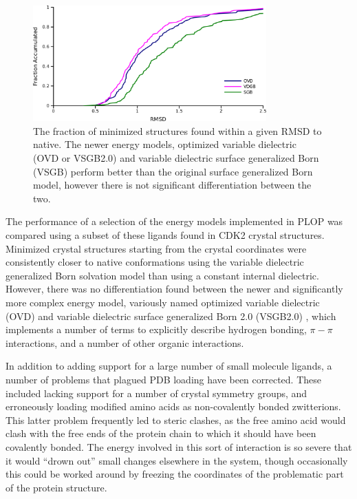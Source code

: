 \begin{figure}[h]
\centering
\includegraphics[width=0.8\textwidth]{figures/small_molecule_minimization.png}
\caption{The fraction of minimized structures found within a given RMSD to native.
The newer energy models, optimized variable dielectric (OVD or VSGB2.0) and variable dielectric surface generalized Born (VSGB) perform better than the original surface generalized Born model, however there is not significant differentiation between the two.}
\label{figure:small_molecule_minimization}
\end{figure}

The performance of a selection of the energy models implemented in PLOP was compared using a subset of these ligands found in CDK2 crystal structures.
Minimized crystal structures starting from the crystal coordinates were consistently closer to native conformations using the variable dielectric generalized Born solvation model than using a constant internal dielectric.
However, there was no differentiation found between the newer and significantly more complex energy model, variously named optimized variable dielectric (OVD) and variable dielectric surface generalized Born 2.0 (VSGB2.0) \cite{li2011vsgb}, which implements a number of terms to explicitly describe hydrogen bonding, $\pi-\pi$ interactions, and a number of other organic interactions.

In addition to adding support for a large number of small molecule ligands, a number of problems that plagued PDB loading have been corrected.
These included lacking support for a number of crystal symmetry groups, and erroneously loading modified amino acids as non-covalently bonded zwitterions.
This latter problem frequently led to steric clashes, as the free amino acid would clash with the free ends of the protein chain to which it should have been covalently bonded.
The energy involved in this sort of interaction is so severe that it would ``drown out'' small changes elsewhere in the system, though occasionally this could be worked around by freezing the coordinates of the problematic part of the protein structure.

